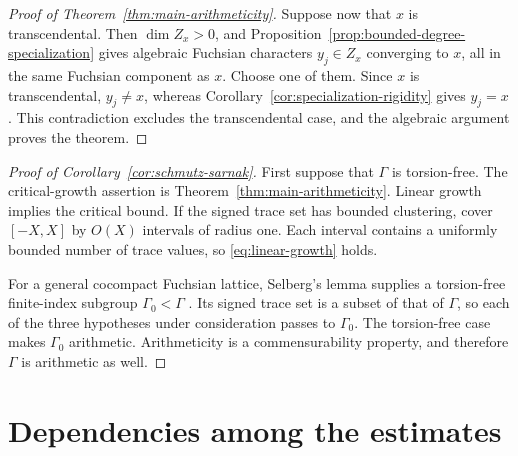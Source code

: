 \documentclass[11pt,reqno]{amsart}
\theoremstyle{definition}
\theoremstyle{remark}
\begin{document}
\begin{proof}[Proof of Theorem~\ref{thm:main-arithmeticity}]
Suppose now that \(x\) is transcendental.  Then \(\dim Z_x>0\), and
Proposition~\ref{prop:bounded-degree-specialization} gives algebraic
Fuchsian characters \(y_j\in Z_x\) converging to \(x\), all in the same
Fuchsian component as \(x\).  Choose one of them.  Since \(x\) is
transcendental, \(y_j\ne x\), whereas
Corollary~\ref{cor:specialization-rigidity} gives \(y_j=x\).
This contradiction excludes the transcendental case, and the algebraic
argument proves the theorem.
\end{proof}

\begin{proof}[Proof of Corollary~\ref{cor:schmutz-sarnak}]
First suppose that \(\Gamma\) is torsion-free.  The critical-growth assertion
is Theorem~\ref{thm:main-arithmeticity}.  Linear growth implies the critical
bound.  If the signed trace set has bounded clustering, cover \([-X,X]\) by
\(O(X)\) intervals of radius one.  Each interval contains a uniformly
bounded number of trace values, so \eqref{eq:linear-growth} holds.

For a general cocompact Fuchsian lattice, Selberg's lemma supplies a
torsion-free finite-index subgroup \(\Gamma_0<\Gamma\)
\cite{AlperinSelberg}.  Its signed trace set is a subset of that of
\(\Gamma\), so each of the three hypotheses under consideration passes to
\(\Gamma_0\).  The torsion-free case makes \(\Gamma_0\) arithmetic.
Arithmeticity is a commensurability property, and therefore \(\Gamma\) is
arithmetic as well.
\end{proof}

\section{Dependencies among the estimates}
\label{sec:dependency-summary}
\end{document}
